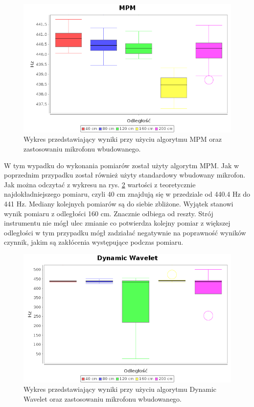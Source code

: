 \begin{figure}[h!]
  \centering
  \includegraphics[width=0.9\linewidth]{rys/BoxPlots/MPM_mic_wb}
  \caption{Wykres przedstawiający wyniki przy użyciu algorytmu MPM oraz zastosowaniu mikrofonu wbudowanego.}
  \label{mpmwb}
\end{figure}


W tym wypadku do wykonania pomiarów został użyty algorytm MPM. Jak w poprzednim przypadku został również użyty standardowy wbudowany mikrofon. Jak można odczytać z wykresu na rys. \ref{dynamicwb} wartości z teoretycznie najdokładniejszego pomiaru, czyli 40 cm znajdują się w przedziale od 440.4 Hz do 441 Hz. Mediany kolejnych pomiarów są do siebie zbliżone. Wyjątek stanowi wynik pomiaru z odległości 160 cm. Znacznie odbiega od reszty. Strój instrumentu nie mógł ulec zmianie co potwierdza kolejny pomiar z większej odległości  w tym przypadku mógł zadziałać negatywnie na poprawność wyników czynnik, jakim są zakłócenia występujące podczas pomiaru.


\begin{figure}[h!]
  \centering
  \includegraphics[width=0.9\linewidth]{rys/BoxPlots/Dynamic_mic_wb}
  \caption{Wykres przedstawiający wyniki przy użyciu algorytmu Dynamic Wavelet oraz zastosowaniu mikrofonu wbudowanego.}
  \label{dynamicwb}
\end{figure}

